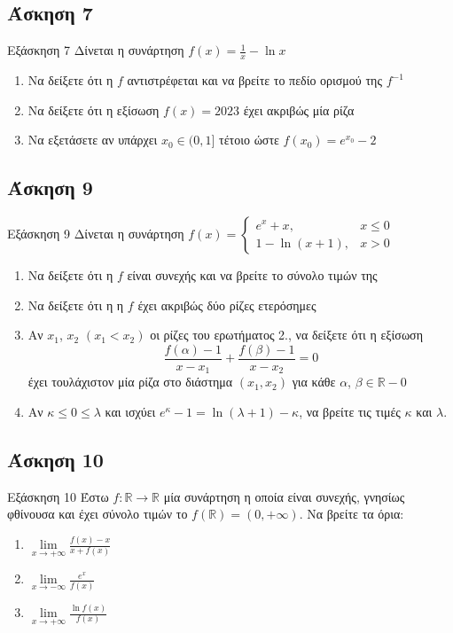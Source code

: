 \documentclass[greek]{beamer}
\begin{document}
\subsection{Άσκηση 7}
\begin{frame}{Εξάσκηση 7}
      Δίνεται η συνάρτηση $f(x)=\frac{1}{x}-\ln x$
      \begin{enumerate}
            \item<1-> Να δείξετε ότι η $f$ αντιστρέφεται και να βρείτε το πεδίο ορισμού της $f^{-1}$
            \item<2-> Να δείξετε ότι η εξίσωση $f(x)=2023$ έχει ακριβώς μία ρίζα
            \item<3-> Να εξετάσετε αν υπάρχει $x_0\in (0,1]$ τέτοιο ώστε $f(x_0)=e^{x_0}-2$
      \end{enumerate}
\end{frame}



\subsection{Άσκηση 9}
\begin{frame}{Εξάσκηση 9}
      Δίνεται η συνάρτηση $f(x)=\begin{cases}
                  e^x+x,       & x\le 0 \\
                  1-\ln (x+1), & x>0
            \end{cases}$
      \begin{enumerate}
            \item<1-> Να δείξετε ότι η $f$ είναι συνεχής και να βρείτε το σύνολο τιμών της
            \item<2-> Να δείξετε ότι η η $f$ έχει ακριβώς δύο ρίζες ετερόσημες
            \item<3-> Αν $x_1$, $x_2$ $(x_1<x_2)$ οι ρίζες του ερωτήματος 2., να δείξετε ότι η εξίσωση
                  $$\frac{f(α)-1}{x-x_1}+\frac{f(β)-1}{x-x_2}=0$$
                  έχει τουλάχιστον μία ρίζα στο διάστημα $(x_1,x_2)$ για κάθε $α$, $β\in\mathbb{R}-{0}$
            \item<4-> Αν $κ\le 0\le λ$ και ισχύει $e^κ-1=\ln (λ+1)-κ$, να βρείτε τις τιμές $κ$ και $λ$.
      \end{enumerate}
\end{frame}

\subsection{Άσκηση 10}
\begin{frame}{Εξάσκηση 10}
      Έστω $f:\mathbb{R}\to\mathbb{R}$ μία συνάρτηση η οποία είναι συνεχής, γνησίως φθίνουσα και έχει σύνολο τιμών το $f(\mathbb{R})=(0,+\infty)$. Να βρείτε τα όρια:
      \begin{enumerate}
            \item<1-> $\lim\limits_{x \to +\infty}{ \frac{f(x)-x}{x+f(x)} }$
            \item<2-> $\lim\limits_{x \to -\infty}{ \frac{e^x}{f(x)} }$
            \item<3-> $\lim\limits_{x \to +\infty}{ \frac{\ln f(x)}{f(x)} }$
      \end{enumerate}
\end{frame}
\end{document}
